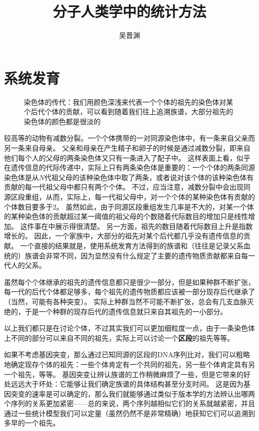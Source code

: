 \documentclass[hyperref, UTF8, a4paper, oneside]{ctexart}
\title{分子人类学中的统计方法}
\author{吴晋渊}
\renewcommand{\emph}[1]{\textbf{#1}}
\numberwithin{equation}{section}
\begin{document}
\maketitle

\section{系统发育}

\begin{figure}
    \centering
    
    \caption{染色体的传代：我们用颜色深浅来代表一个个体的祖先的染色体对某个后代个体的贡献，可以看到随着我们往上追溯族谱，大部分祖先的染色体的颜色都是很淡的}
    \label{fig:generation-passing}
\end{figure}

较高等的动物有减数分裂。一个个体携带的一对同源染色体中，有一条来自父亲而另一条来自母亲。
父亲和母亲在产生精子和卵子的时候是通过减数分裂，即来自他们每个人的父母的两条染色体又只有一条进入了配子中。
这样表面上看，似乎在遗传信息的代际传递中，实际上只有两条染色体是重要的：一个个体的两条同源染色体是从$N$代祖父母的该种染色体中取了两条，或者说对该个体的该种染色体有贡献的每一代祖父母中都只有两个个体。
不过，应当注意，减数分裂中会出现同源区段重组，从而，实际上，每一代祖父母中，对一个个体的某种染色体有贡献的个体数目要多于$2$。
虽然如此，由于同源区段重组发生几率是不大的，对某一个体的某种染色体的贡献超过某一阈值的祖父母的个数随着代际数目的增加只是线性增加。
这件事在中展示得很清楚。
另一方面，祖先的数目随着代际数目上升是指数增长的。
因此，一个家族中，大部分的祖先对某个后代都几乎没有遗传信息的贡献。
一个直接的结果就是，使用系统发育方法得到的族谱和（往往是记录父系血统的）族谱会非常不同，因为显然没有什么规定了主要的遗传物质贡献都来自每一代人的父系。

虽然每个个体继承的祖先的遗传信息都只是很少一部分，但是如果种群不断扩张，每一代的后代个体都足够多，每个祖先的遗传物质都应该被一部分现存后代继承了（当然，可能有各种突变）。
实际上种群当然不可能不断扩张，总会有几支血脉灭绝的，于是一个种群的现存后代的遗传信息就只来自其祖先的一小部分。

以上我们都只是在讨论个体，不过其实我们可以更加细粒度一点，由于一条染色体上不同的部分可以来自不同的祖先，实际上可以讨论一个\emph{区段}的祖先等等。

如果不考虑基因突变，那么通过已知同源的区段的DNA序列比对，我们可以粗略地确定现存个体的祖先：一些个体肯定有一个共同的祖先，另一些个体肯定具有另一个祖先，等等。
基因突变让辨认族谱的工作稍微麻烦了一些，但是它带来的好处远远大于坏处：它能够让我们确定族谱的具体结构甚至分支时间。
这是因为基因突变的速率是可以确定的，那么我们就能够通过类似于版本学的方法辨认出哪两个序列的关系更加紧密——总的来说，两个序列越相似它们的关系就越紧密，并且通过一些统计模型我们可以定量（虽然仍然不是非常精确）地获知它们可以追溯到多早的一个祖先。
\end{document}
